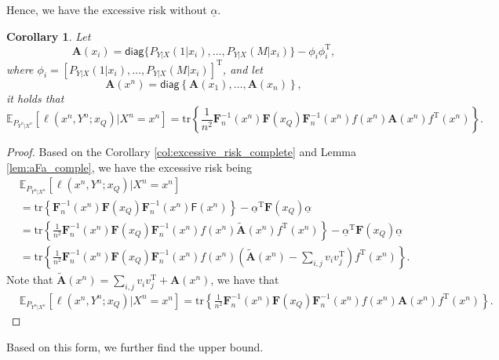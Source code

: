 \documentclass{article} %
\theoremstyle{plain} %
\newtheorem{corollary}[theorem]{Corollary}
\begin{document}
Hence, we have the excessive risk without $\underline{\alpha}$.
\begin{corollary}\label{col:excessive_risk_complete_simple}
Let 
\[
\textbf{A}(x_i) = \mathsf{diag}\{P_{Y|X}(1|x_i),\dots,P_{Y|X}(M|x_i)\}-\phi_i\phi_i^\mathrm{T},
\]
where $\phi_i = [P_{Y|X}(1|x_i),\dots,P_{Y|X}(M|x_i)]^\mathrm{T}$, and let
\begin{equation*}
\textbf{A}(x^n) = \mathsf{diag}\left\{ \textbf{A}(x_1), \ldots, \textbf{A}(x_n) \right\},
\end{equation*}
it holds that
\begin{equation*}
    \mathbb{E}_{P_{Y^n|X^n}}\left[ 
\ell \left(x^n,Y^n;x_Q\right) | X^n = x^n\right]= \mathrm{tr}\left\{ \frac1{n^2}\mathbf{F}_n^{-1}(x^n)\mathbf{F}(x_Q)\mathbf{F}_n^{-1}(x^n) f(x^n) {\mathbf{A}}(x^n) f^\mathrm{T}(x^n) \right\}.
\end{equation*}
\end{corollary}
\begin{proof}
    Based on the Corollary \ref{col:excessive_risk_complete} and Lemma \ref{lem:aFa_comple}, we have the excessive risk being
\begin{align*}
& \mathbb{E}_{P_{Y^n|X^n}}\left[ 
\ell \left(x^n,Y^n;x_Q\right) | X^n = x^n\right]\\
&= \mathrm{tr}\left\{ \mathbf{F}_n^{-1}(x^n)\mathbf{F}(x_Q)\mathbf{F}_n^{-1}(x^n) \mathsf{F}(x^n) \right\}  - \underline{\alpha}^{\mathrm{T}} \mathbf{F}(x_Q)\underline{\alpha}\\
& = \mathrm{tr}\left\{ \frac1{n^2}\mathbf{F}_n^{-1}(x^n)\mathbf{F}(x_Q)\mathbf{F}_n^{-1}(x^n) f(x^n) \tilde{\mathbf{A}}(x^n)f^\mathrm{T}(x^n) \right\}  - \underline{\alpha}^{\mathrm{T}} \mathbf{F}(x_Q)\underline{\alpha}\\
& = \mathrm{tr}\left\{ \frac1{n^2}\mathbf{F}_n^{-1}(x^n)\mathbf{F}(x_Q)\mathbf{F}_n^{-1}(x^n) f(x^n) \left(\tilde{\mathbf{A}}(x^n) - \sum_{i,j}v_iv_j^\mathrm{T}\right)f^\mathrm{T}(x^n) \right\}.
\end{align*}
Note that $\tilde{\mathbf{A}}(x^n) = \sum_{i,j}v_iv_j^\mathrm{T} + \mathbf{A}(x^n)$, we have that
\begin{align*}
& \mathbb{E}_{P_{Y^n|X^n}}\left[ 
\ell \left(x^n,Y^n;x_Q\right) | X^n = x^n\right]= \mathrm{tr}\left\{ \frac1{n^2}\mathbf{F}_n^{-1}(x^n)\mathbf{F}(x_Q)\mathbf{F}_n^{-1}(x^n) f(x^n) {\mathbf{A}}(x^n) f^\mathrm{T}(x^n) \right\}.
\end{align*}
\end{proof}

Based on this form, we further find the upper bound.
\end{document}
